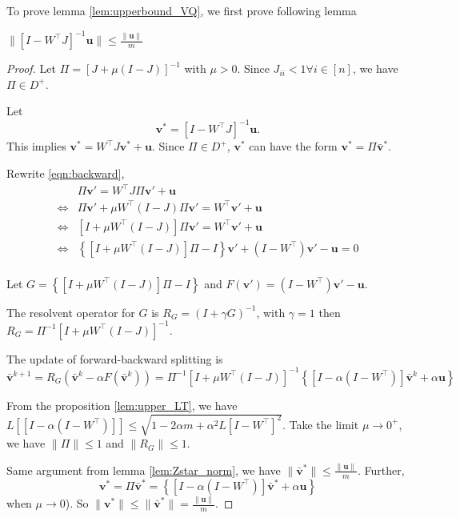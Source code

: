 \documentclass[twoside]{article}
\begin{document}
To prove lemma \ref{lem:upperbound_VQ}, we first prove following lemma
\begin{lemma}
$\|  [I - W^\top J]^{-1} \mathbf{u} \| \le \frac{\| \mathbf{u}\|}{m}$
\end{lemma}
\begin{proof}
\label{proof:upperbound_vQ}
Let $\Pi = [J + \mu (I - J)]^{-1}$ with $\mu > 0$. 
Since $J_{ii} < 1 \forall i \in [n]$, we have $\Pi \in D^+$.

Let 
\begin{equation}
    \label{eqn:backward}
    \mathbf{v}^* = [I - W^\top J]^{-1} \mathbf{u}.
\end{equation}
This implies $\mathbf{v}^* = W^\top J \mathbf{v}^* + \mathbf{u}$.
Since $\Pi \in D^+$, $\mathbf{v}^*$ can have the form $\mathbf{v}^* = \Pi \bar{\mathbf{v}}^*$.

Rewrite \ref{eqn:backward},
\begin{align*}
    &\Pi \mathbf{v}' = W^\top J \Pi \mathbf{v}' + \mathbf{u} \\
    \Leftrightarrow &\Pi \mathbf{v}' + \mu W^\top (I - J) \Pi \mathbf{v}' = W^\top \mathbf{v}' + \mathbf{u} \\
    \Leftrightarrow & \left[I + \mu W^\top (I - J)\right ]\Pi \mathbf{v}' = W^\top \mathbf{v}' + \mathbf{u} \\
    \Leftrightarrow & \left\{\left[I + \mu W^\top (I - J) \right]\Pi - I \right\} \mathbf{v}' + \left( I  - W^\top \right) \mathbf{v}' - \mathbf{u} = 0\\
\end{align*}

Let $G = \left\{\left[I + \mu W^\top (I - J) \right]\Pi - I \right\}$ and $F(\mathbf{v}') = \left( I  - W^\top \right) \mathbf{v}' - \mathbf{u}$.

The resolvent operator for $G$ is $R_G = (I + \gamma G)^{-1}$, with $\gamma = 1$ then $R_G = \Pi^{-1}\left[I + \mu W^\top (I - J) \right]^{-1}$.


The update of forward-backward splitting is 
\begin{equation}
    \bar{\mathbf{v}}^{k + 1} = R_G(\bar{\mathbf{v}}^{k} - \alpha F(\bar{\mathbf{v}}^{k})) = \Pi^{-1}\left[I + \mu W^\top (I - J) \right]^{-1}\left\{\left[I - \alpha(I - W^\top)\right]\bar{\mathbf{v}}^{k} + \alpha \mathbf{u} \right\}
\end{equation}


From the proposition \ref{lem:upper_LT}, we have $L[\left[I - \alpha(I - W^\top)\right]] \leq \sqrt{1-2 \alpha m+\alpha^{2} L[I-W^\top]^{2}}$.
Take the limit $\mu \to 0^+$, we have $\|\Pi\| \le 1$ and $\|R_G\| \le 1$.

Same argument from lemma \ref{lem:Zstar_norm}, we have $\| \bar{\mathbf{v}}^* \| \le \frac{\|\mathbf{u}\|}{m}$.
Further,
\begin{equation*}
    \mathbf{v}^* = \Pi \bar{\mathbf{v}}^* = \left\{\left[I - \alpha(I - W^\top)\right]\bar{\mathbf{v}}^* + \alpha \mathbf{u} \right\}
\end{equation*}
when $\mu \to 0$).
So $\|\mathbf{v}^*\| \le \| \bar{\mathbf{v}}^* \| = \frac{\|\mathbf{u}\|}{m}$.
\end{proof}
\end{document}
